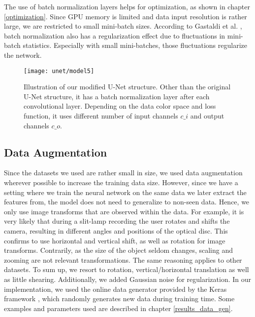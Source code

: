 The use of batch normalization layers helps for optimization, as shown in chapter \ref{optimization}.
Since GPU memory is limited and data input resolution is rather large, we are restricted to small mini-batch sizes.
According to Gastaldi et al. \cite{gastaldi17}, batch normalization also has a regularization effect due to fluctuations in mini-batch statistics. Especially with small mini-batches, those fluctuations regularize the network.

\clearpage
\begin{figure}[!htbp]
  \centering
  \texttt{[image: unet/model5]}
  \caption[Modified U-Net architecture]{Illustration of our modified U-Net structure. Other than the original U-Net structure, it has a batch normalization layer after each convolutional layer. Depending on the data color space and loss function, it uses different number of input channels $c\_i$ and output channels $c\_o$.}
  \label{fig:unet_model}
\end{figure}

\subsection{Data Augmentation} \label{ch:data_gen}
Since the datasets we used are rather small in size, we used data augmentation wherever possible to increase the training data size. However, since we have a setting where we train the neural network on the same data we later extract the features from, the model does not need to generalize to non-seen data. Hence, we only use image transforms that are observed within the data. For example, it is very likely that during a slit-lamp recording the user rotates and shifts the camera, resulting in different angles and positions of the optical disc. This confirms to use horizontal and vertical shift, as well as rotation for image transforms. Contrarily, as the size of the object seldom changes, scaling and zooming are not relevant transformations.
The same reasoning applies to other datasets.
To sum up, we resort to rotation, vertical/horizontal translation as well as little shearing. Additionally, we added Gaussian noise for regularization. In our implementation, we used the online data generator provided by the Keras framework \cite{Keras}, which randomly generates new data during training time. Some examples and parameters used are described in chapter \ref{results_data_gen}.

\clearpage
